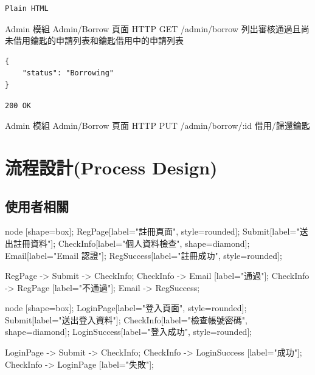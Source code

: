 \documentclass{article}
\begin{document}
\begin{lrbox}{\jsonoutputbox}
	\begin{lstlisting}
Plain HTML
\end{lstlisting}
\end{lrbox}

{Admin 模組}
{Admin/Borrow 頁面}
{HTTP GET}
{/admin/borrow}
{列出審核通過且尚未借用鑰匙的申請列表和鑰匙借用中的申請列表}

\bigskip

\begin{lrbox}{\jsoninputbox}
	\begin{lstlisting}[basicstyle=\footnotesize\ttfamily]
{
	"status": "Borrowing"
}
\end{lstlisting}
\end{lrbox}

\begin{lrbox}{\jsonoutputbox}
	\begin{lstlisting}
200 OK
\end{lstlisting}
\end{lrbox}

{Admin 模組}
{Admin/Borrow 頁面}
{HTTP PUT}
{/admin/borrow/:id}
{借用/歸還鑰匙}

\newpage

\section[流程設計(PROCESS DESIGN)]{流程設計(Process Design)}

\subsection{使用者相關}

\begin{center}

	 {
		node [shape=box];
		RegPage[label="註冊頁面", style=rounded];
		Submit[label="送出註冊資料"];
		CheckInfo[label="個人資料檢查", shape=diamond];
		Email[label="Email 認證"];
		RegSuccess[label="註冊成功", style=rounded];

		RegPage -> Submit -> CheckInfo;
		CheckInfo -> Email [label="通過"];
		CheckInfo -> RegPage [label="不通過"];
		Email -> RegSuccess;
	}
\end{center}

\begin{center}

	 {
		node [shape=box];
		LoginPage[label="登入頁面", style=rounded];
		Submit[label="送出登入資料"];
		CheckInfo[label="檢查帳號密碼", shape=diamond];
		LoginSuccess[label="登入成功", style=rounded];

		LoginPage -> Submit -> CheckInfo;
		CheckInfo -> LoginSuccess [label="成功"];
		CheckInfo -> LoginPage [label="失敗"];
	}
\end{center}
\end{document}

